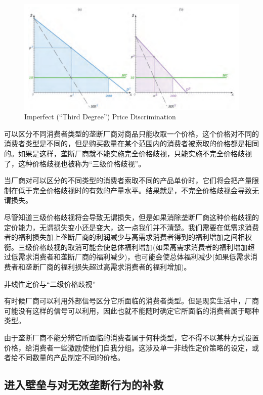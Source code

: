\documentclass{article}
\begin{document}
\begin{figure}[H] %
	\centering %
	\includegraphics[width=1\textwidth]{23_4} %
	\caption{Imperfect (“Third Degree”) Price Discrimination} %
	\label{Fig.main5} %
\end{figure}

可以区分不同消费者类型的垄断厂商对商品只能收取一个价格，这个价格对不同的消费者类型是不同的，但是购买数量在某个范围内的消费者被索取的价格都是相同的。如果是这样，垄断厂商就不能实施完全价格歧视，只能实施不完全价格歧视了，这种价格歧视也被称为“三级价格歧视”。

当厂商对可以区分的不同类型的消费者索取不同的产品单价时，它们将会把产量限制在低于完全价格歧视时的有效的产量水平。结果就是，不完全价格歧视会导致无谓损失。

尽管知道三级价格歧视将会导致无谓损失，但是如果消除垄断厂商这种价格歧视的定价能力，无谓损失变小还是变大，这一点我们并不清楚。我们需要在低需求消费者的福利损失加上垄断厂商的利润减少与高需求消费者得到的福利增加之间相权衡。三级价格歧视的取消可能会使总体福利增加(如果高需求消费者的福利增加超过低需求消费者和垄断厂商的福利减少)，也可能会使总体福利减少(如果低需求消费者和垄断厂商的福利损失超过高需求消费者的福利增加)。

\hspace*{\fill}

非线性定价与“二级价格歧视”

有时候厂商可以利用外部信号区分它所面临的消费者类型。但是现实生活中，厂商可能没有这样的信号可以利用，因此也就不能随时确定它所面临的消费者属于哪种类型。

由于垄断厂商不能分辨它所面临的消费者属于何种类型，它不得不以某种方式设置价格，给消费者一些激励使他们自我分组。这涉及单一非线性定价策略的设定，或者给不同数量的产品制定不同的价格。

\subsection{进入壁垒与对无效垄断行为的补救}
\end{document}
